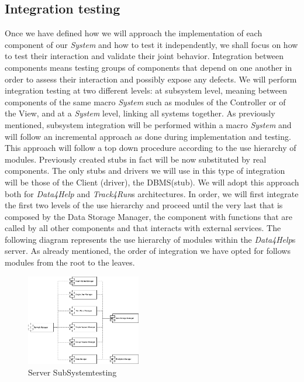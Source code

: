 \documentclass[titlepage]{article}
\begin{document}
	\subsection{Integration testing}
	Once we have defined how we will approach the implementation of each component of our {\it System} and how to test it independently, we shall focus on how to test their interaction and validate their joint behavior. Integration between components means testing groups of components that depend on one another in order to assess their interaction and possibly expose any defects. We will perform integration testing at two different levels: at subsystem level, meaning between components of the same macro {\it System} such as modules of the Controller or of the View, and at a {\it System} level, linking all systems together.
	\newline
	\newline
	As previously mentioned, subsystem integration will be performed within a macro {\it System} and will follow an incremental approach as done during implementation and testing. This approach will follow a top down procedure according to the use hierarchy of modules. Previously created stubs in fact will be now substituted by real components. The only stubs and drivers we will use in this type of integration will be those of the Client (driver), the DBMS(stub). We will adopt this approach both for {\it Data4Help} and {\it Track4Run}\textsc{}s architectures. In order, we will first integrate the first two levels of the use hierarchy and proceed until the very last that is composed by the Data Storage Manager, the component with functions that are called by all other components and that interacts with external services. 
	\newline
	\newline
	The following diagram represents the use hierarchy of modules within the {\it Data4Help}\textsc{}s server. As already mentioned, the order of integration we have opted for follows modules from the root to the leaves.
	\begin{figure}[H]
		\center
		\includegraphics[width=5cm]{serverSubSystemTesting.png}
		\caption{Server SubSystemtesting}
		\label{fig:serverSubSystemTesting}
	\end{figure}
\end{document}
